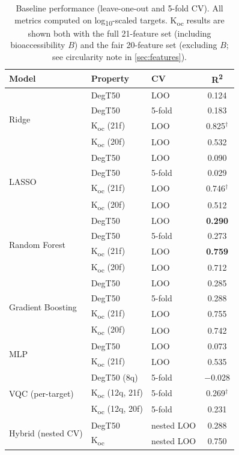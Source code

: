 \documentclass[12pt,a4paper]{article}
\newcommand{\degtl}{DegT50}
\newcommand{\koc}{K\textsubscript{oc}}
\newcommand{\rtwo}{R\textsuperscript{2}}
\begin{document}
\begin{table}[htbp]
  \centering
  \caption{Baseline performance (leave-one-out and 5-fold CV).
           All metrics computed on log\textsubscript{10}-scaled targets.
           \koc{} results are shown both with the full 21-feature set
           (including bioaccessibility $B$) and the fair 20-feature set
           (excluding $B$; see circularity note in \cref{sec:features}).}
  \label{tab:baselines}
  \small
  \begin{tabular}{lllc}
    \toprule
    \textbf{Model} & \textbf{Property} & \textbf{CV} &
      \textbf{\rtwo{}} \\
    \midrule
    \multirow{4}{*}{Ridge}
      & \degtl{}         & LOO    & 0.124   \\
      & \degtl{}         & 5-fold & 0.183   \\
      & \koc{} (21f)     & LOO    & 0.825$^\dagger$ \\
      & \koc{} (20f)     & LOO    & 0.532   \\
    \midrule
    \multirow{4}{*}{LASSO}
      & \degtl{}         & LOO    & 0.090   \\
      & \degtl{}         & 5-fold & 0.029   \\
      & \koc{} (21f)     & LOO    & 0.746$^\dagger$ \\
      & \koc{} (20f)     & LOO    & 0.512   \\
    \midrule
    \multirow{4}{*}{Random Forest}
      & \degtl{}         & LOO    & \textbf{0.290}   \\
      & \degtl{}         & 5-fold & 0.273   \\
      & \koc{} (21f)     & LOO    & \textbf{0.759}   \\
      & \koc{} (20f)     & LOO    & 0.712   \\
    \midrule
    \multirow{4}{*}{Gradient Boosting}
      & \degtl{}         & LOO    & 0.285   \\
      & \degtl{}         & 5-fold & 0.288   \\
      & \koc{} (21f)     & LOO    & 0.755   \\
      & \koc{} (20f)     & LOO    & 0.742   \\
    \midrule
    \multirow{2}{*}{MLP}
      & \degtl{}         & LOO    & 0.073   \\
      & \koc{} (21f)     & LOO    & 0.535   \\
    \midrule
    \multirow{3}{*}{VQC (per-target)}
      & \degtl{} (8q)    & 5-fold & $-$0.028 \\
      & \koc{} (12q, 21f) & 5-fold & 0.269$^\dagger$  \\
      & \koc{} (12q, 20f) & 5-fold & 0.231   \\
    \midrule
    \multirow{2}{*}{Hybrid (nested CV)}
      & \degtl{}         & nested LOO & 0.288   \\
      & \koc{}           & nested LOO & 0.750   \\
    \bottomrule
  \end{tabular}


\end{table}
\end{document}
